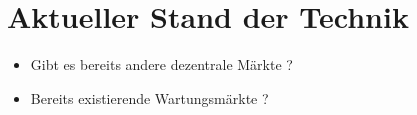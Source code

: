 \chapter{Aktueller Stand der Technik}
\label{cha:stand-technik}






\begin{itemize}
    \item Gibt es bereits andere dezentrale Märkte ?
    \item Bereits existierende Wartungsmärkte ?
\end{itemize}


